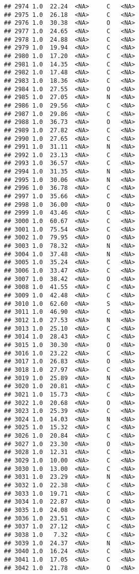 \documentclass[
]{article}
\begin{document}
\begin{verbatim}
## 2974 1.0  22.24  <NA>     C   <NA>
## 2975 1.0  26.18  <NA>     C   <NA>
## 2976 1.0  30.38  <NA>     O   <NA>
## 2977 1.0  24.65  <NA>     C   <NA>
## 2978 1.0  24.88  <NA>     C   <NA>
## 2979 1.0  19.94  <NA>     C   <NA>
## 2980 1.0  17.20  <NA>     C   <NA>
## 2981 1.0  14.35  <NA>     C   <NA>
## 2982 1.0  17.48  <NA>     C   <NA>
## 2983 1.0  18.36  <NA>     C   <NA>
## 2984 1.0  27.55  <NA>     O   <NA>
## 2985 1.0  27.05  <NA>     N   <NA>
## 2986 1.0  29.56  <NA>     C   <NA>
## 2987 1.0  29.86  <NA>     C   <NA>
## 2988 1.0  36.73  <NA>     O   <NA>
## 2989 1.0  27.82  <NA>     C   <NA>
## 2990 1.0  27.65  <NA>     C   <NA>
## 2991 1.0  31.11  <NA>     N   <NA>
## 2992 1.0  23.13  <NA>     C   <NA>
## 2993 1.0  36.57  <NA>     C   <NA>
## 2994 1.0  31.35  <NA>     N   <NA>
## 2995 1.0  30.06  <NA>     N   <NA>
## 2996 1.0  36.78  <NA>     C   <NA>
## 2997 1.0  35.66  <NA>     C   <NA>
## 2998 1.0  36.00  <NA>     O   <NA>
## 2999 1.0  43.46  <NA>     C   <NA>
## 3000 1.0  60.67  <NA>     C   <NA>
## 3001 1.0  75.54  <NA>     C   <NA>
## 3002 1.0  79.95  <NA>     O   <NA>
## 3003 1.0  78.32  <NA>     N   <NA>
## 3004 1.0  37.48  <NA>     N   <NA>
## 3005 1.0  35.24  <NA>     C   <NA>
## 3006 1.0  33.47  <NA>     C   <NA>
## 3007 1.0  38.42  <NA>     O   <NA>
## 3008 1.0  41.55  <NA>     C   <NA>
## 3009 1.0  42.48  <NA>     C   <NA>
## 3010 1.0  62.60  <NA>     S   <NA>
## 3011 1.0  46.90  <NA>     C   <NA>
## 3012 1.0  27.53  <NA>     N   <NA>
## 3013 1.0  25.10  <NA>     C   <NA>
## 3014 1.0  28.43  <NA>     C   <NA>
## 3015 1.0  30.30  <NA>     O   <NA>
## 3016 1.0  23.22  <NA>     C   <NA>
## 3017 1.0  26.83  <NA>     O   <NA>
## 3018 1.0  27.97  <NA>     C   <NA>
## 3019 1.0  25.89  <NA>     N   <NA>
## 3020 1.0  20.81  <NA>     C   <NA>
## 3021 1.0  15.73  <NA>     C   <NA>
## 3022 1.0  20.68  <NA>     O   <NA>
## 3023 1.0  25.39  <NA>     C   <NA>
## 3024 1.0  14.03  <NA>     N   <NA>
## 3025 1.0  15.32  <NA>     C   <NA>
## 3026 1.0  20.84  <NA>     C   <NA>
## 3027 1.0  23.30  <NA>     O   <NA>
## 3028 1.0  12.31  <NA>     C   <NA>
## 3029 1.0  10.00  <NA>     C   <NA>
## 3030 1.0  13.00  <NA>     C   <NA>
## 3031 1.0  23.29  <NA>     N   <NA>
## 3032 1.0  22.38  <NA>     C   <NA>
## 3033 1.0  19.71  <NA>     C   <NA>
## 3034 1.0  22.87  <NA>     O   <NA>
## 3035 1.0  24.08  <NA>     C   <NA>
## 3036 1.0  23.51  <NA>     C   <NA>
## 3037 1.0  27.12  <NA>     C   <NA>
## 3038 1.0   7.32  <NA>     C   <NA>
## 3039 1.0  24.37  <NA>     N   <NA>
## 3040 1.0  16.24  <NA>     C   <NA>
## 3041 1.0  17.05  <NA>     C   <NA>
## 3042 1.0  21.78  <NA>     O   <NA>

\end{verbatim}
\end{document}
